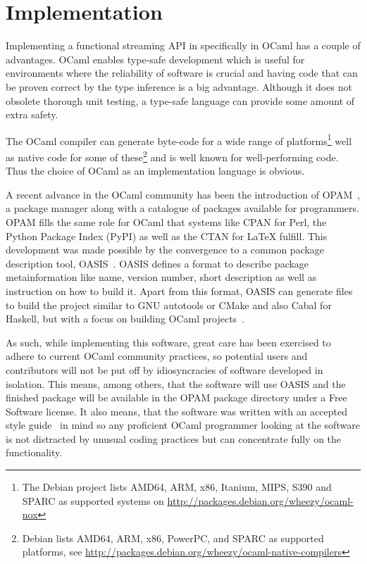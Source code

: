\documentclass[parskip=half]{scrreprt}
\begin{document}
\chapter{Implementation}
\label{sec:implementation}

Implementing a functional streaming API in specifically in OCaml has a couple
of advantages. OCaml enables type-safe development which is useful for
environments where the reliability of software is crucial and having code that
can be proven correct by the type inference is a big advantage. Although it
does not obsolete thorough unit testing, a type-safe language can provide some
amount of extra safety.

The OCaml compiler can generate byte-code for a wide range of
platforms\footnote{The Debian project lists AMD64, ARM, x86, Itanium, MIPS, S390
and SPARC as supported systems on
\url{http://packages.debian.org/wheezy/ocaml-nox}} well as native code for some
of these\footnote{Debian lists AMD64, ARM, x86, PowerPC, and SPARC as supported
platforms, see
\url{http://packages.debian.org/wheezy/ocaml-native-compilers}} and is well
known for well-performing code. Thus the choice of OCaml as an implementation
language is obvious.

A recent advance in the OCaml community has been the introduction of
OPAM~\cite{gazagnaire2013opam}, a package manager along with a catalogue of
packages available for programmers.  OPAM fills the same role for OCaml that
systems like CPAN for Perl, the Python Package Index (PyPI) as well as the CTAN
for \LaTeX{} fulfill. This development was made possible by the convergence to a
common package description tool, OASIS~\cite{legall2012oasis}. OASIS defines a
format to describe package metainformation like name, version number, short
description as well as instruction on how to build it.  Apart from this format,
OASIS can generate files to build the project similar to GNU autotools or CMake
and also Cabal for Haskell, but with a focus on building OCaml
projects~\cite{legall2011quickstart}.

As such, while implementing this software, great care has been exercised to
adhere to current OCaml community practices, so potential users and
contributors will not be put off by idiosyncracies of software developed in
isolation. This means, among others, that the software will use OASIS and the
finished package will be available in the OPAM package directory under a Free
Software license. It also means, that the software was written with an accepted
style guide~\cite{ocamlstyle} in mind so any proficient OCaml programmer
looking at the software is not distracted by unusual coding practices but can
concentrate fully on the functionality.
\end{document}
